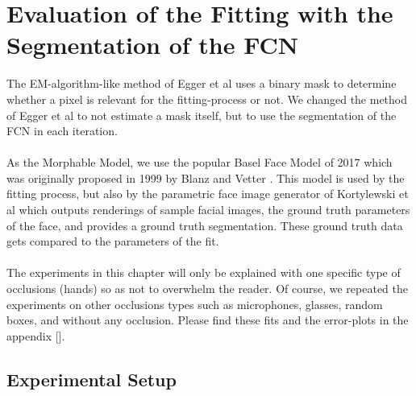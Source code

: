 \chapter{Evaluation of the Fitting with the Segmentation of the FCN}
The EM-algorithm-like method of Egger et al \cite{egger_paper} uses a binary mask to determine whether a pixel is relevant for the fitting-process or not. We changed the method of Egger et al to not estimate a mask itself, but to use the segmentation of the FCN in each iteration.\\
\\
As the Morphable Model, we use the popular Basel Face Model of 2017 \cite{BFM2017} which was originally proposed in 1999 by Blanz and Vetter \cite{BlanzVetter}. This model is used by the fitting process, but also by the parametric face image generator of Kortylewski et al \cite{parametric} which outputs renderings of sample facial images, the ground truth parameters of the face, and provides a ground truth segmentation. These ground truth data gets compared to the parameters of the fit.\\
\\
The experiments in this chapter will only be explained with one specific type of occlusions (hands) so as not to overwhelm the reader. Of course, we repeated the experiments on other occlusions types such as microphones, glasses, random boxes, and without any occlusion. Please find these fits and the error-plots in the appendix [].

\section{Experimental Setup}

